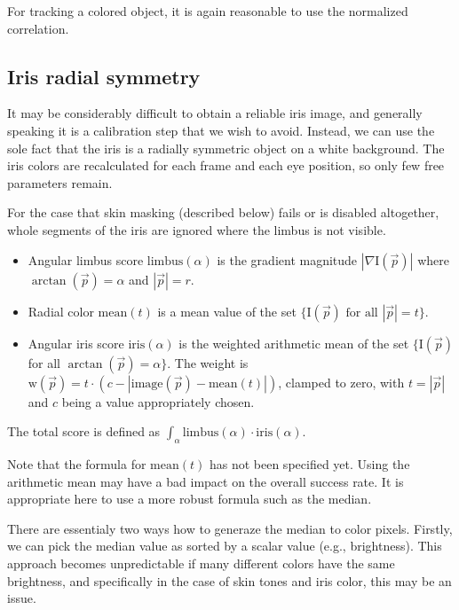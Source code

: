 For tracking a colored object, it is again reasonable to use the normalized correlation.


\subsection{Iris radial symmetry}

It may be considerably difficult to obtain a reliable iris image, and generally speaking it is a calibration step that we wish to avoid.
Instead, we can use the sole fact that the iris is a radially symmetric object on a white background.
The iris colors are recalculated for each frame and each eye position, so only few free parameters remain.

For the case that skin masking (described below) fails or is disabled altogether, whole segments of the iris are ignored where the limbus is not visible.

\begin{itemize}
\item
Angular limbus score $\textrm{limbus}(\alpha)$ is the gradient magnitude $|\nabla \textrm{I}(\vec p)|$ where $\arctan(\vec p) = \alpha$ and $|\vec p| = r$.

\item
Radial color $\textrm{mean}(t)$ is a mean value of the set $\{\textrm{I}(\vec p) \text{ for all } |\vec p| = t \}$.

\item
Angular iris score $\textrm{iris}(\alpha)$ is the weighted arithmetic mean of the set $\{\textrm{I}(\vec p)$ for all $\arctan(\vec p) = \alpha \}$.
The weight is $\textrm{w}(\vec p) = t \cdot (c - |\textrm{image}(\vec p) - \textrm{mean}(t)|)$, clamped to zero, with $t = |\vec p|$ and $c$ being a value appropriately chosen.

\end{itemize}

The total score is defined as $\int_\alpha \textrm{limbus}(\alpha) \cdot \textrm{iris}(\alpha)$.

Note that the formula for $\textrm{mean}(t)$ has not been specified yet.
Using the arithmetic mean may have a bad impact on the overall success rate.
It is appropriate here to use a more robust formula such as the median.

There are essentialy two ways how to generaze the median to color pixels.
Firstly, we can pick the median value as sorted by a scalar value (e.g., brightness).
This approach becomes unpredictable if many different colors have the same brightness, and specifically in the case of skin tones and iris color, this may be an issue.

